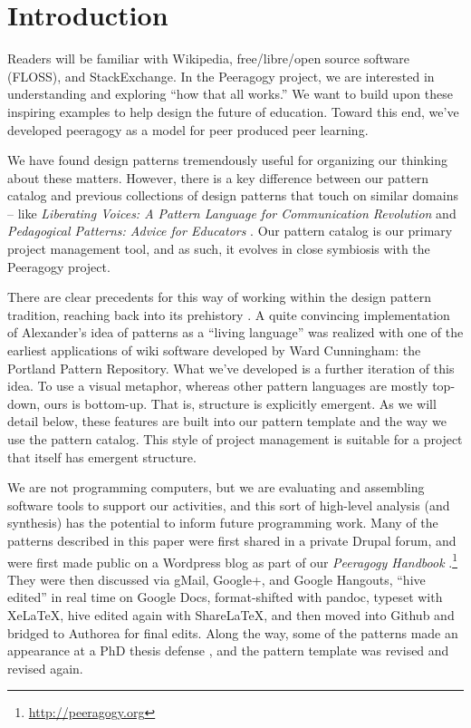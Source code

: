 \section{Introduction}\label{sec:Introduction}

Readers will be familiar with Wikipedia, free/libre/open source software (FLOSS), and StackExchange.  In the Peeragogy project, we are interested in understanding and exploring ``how that all works.''    We want to build upon these inspiring examples to help design the future of education.  Toward this end, we've developed peeragogy as a model for peer produced peer learning.

We have found design patterns tremendously useful for organizing our thinking about these matters.  However, there is a key difference between our pattern catalog and previous collections of design patterns that touch on similar domains -- like \emph{Liberating Voices: A Pattern Language for Communication Revolution} \cite{schuler2008liberating} and \emph{Pedagogical Patterns: Advice for Educators} \cite{bergin2012pedagogical}.  Our pattern catalog is our primary project management tool, and as such, it evolves in close symbiosis with the Peeragogy project.

There are clear precedents for this way of working within the design pattern tradition, reaching back into its prehistory \cite{alexander1964notes}.  A quite convincing implementation of Alexander’s idea of patterns as a ``living language'' \cite[p.~xvii]{alexander1977pattern} was realized with one of the earliest applications of wiki software developed by Ward Cunningham: the Portland Pattern Repository. What we've developed is a further iteration of this idea. To use a visual metaphor, whereas other pattern languages are mostly top-down, ours is bottom-up.  That is, structure is explicitly emergent.  As we will detail below, these features are built into our pattern template and the way we use the pattern catalog.  This style of project management is suitable for a project that itself has emergent structure.

We are not programming computers, but we are evaluating and assembling
software tools to support our activities, and this sort of high-level
analysis (and synthesis) has the potential to inform future
programming work.  Many of the patterns described in this paper were first shared in a private Drupal forum, and were first made public on a Wordpress blog as part of our \emph{Peeragogy Handbook} \cite{peeragogy-handbook}.\footnote{\url{http://peeragogy.org}}  They were then discussed via gMail, Google+, and Google Hangouts, ``hive edited'' in real time on Google Docs, format-shifted with pandoc, typeset with XeLaTeX, hive edited again with ShareLaTeX, and then moved into Github and bridged to Authorea for final edits.  Along the way, some of the patterns made an appearance at a PhD thesis defense \cite{corneli-thesis}, and the pattern template was revised and revised again.  

